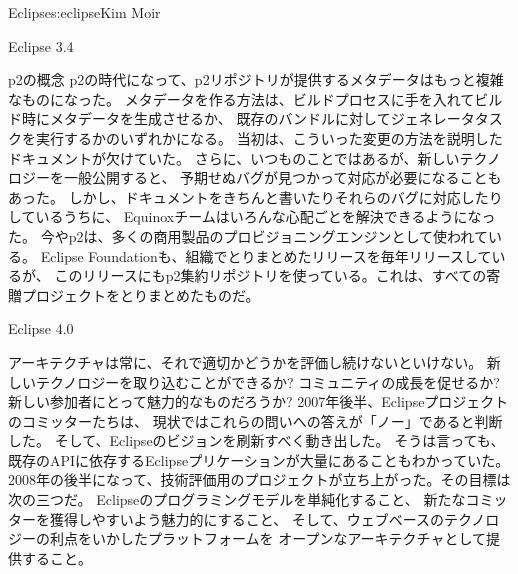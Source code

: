 \begin{aosachapter}{Eclipse}{s:eclipse}{Kim Moir}
\begin{aosasect1}{Eclipse 3.4}
\begin{aosasect2}{p2の概念}
p2の時代になって、p2リポジトリが提供するメタデータはもっと複雑なものになった。
メタデータを作る方法は、ビルドプロセスに手を入れてビルド時にメタデータを生成させるか、
既存のバンドルに対してジェネレータタスクを実行するかのいずれかになる。
当初は、こういった変更の方法を説明したドキュメントが欠けていた。
さらに、いつものことではあるが、新しいテクノロジーを一般公開すると、
予期せぬバグが見つかって対応が必要になることもあった。
しかし、ドキュメントをきちんと書いたりそれらのバグに対応したりしているうちに、
Equinoxチームはいろんな心配ごとを解決できるようになった。
今やp2は、多くの商用製品のプロビジョニングエンジンとして使われている。
Eclipse Foundationも、組織でとりまとめたリリースを毎年リリースしているが、
このリリースにもp2集約リポジトリを使っている。これは、すべての寄贈プロジェクトをとりまとめたものだ。

\end{aosasect2}

\end{aosasect1}

\begin{aosasect1}{Eclipse 4.0}

アーキテクチャは常に、それで適切かどうかを評価し続けないといけない。
新しいテクノロジーを取り込むことができるか?
コミュニティの成長を促せるか?
新しい参加者にとって魅力的なものだろうか?
2007年後半、Eclipseプロジェクトのコミッターたちは、
現状ではこれらの問いへの答えが「ノー」であると判断した。
そして、Eclipseのビジョンを刷新すべく動き出した。
そうは言っても、既存のAPIに依存するEclipseプリケーションが大量にあることもわかっていた。
2008年の後半になって、技術評価用のプロジェクトが立ち上がった。その目標は次の三つだ。
Eclipseのプログラミングモデルを単純化すること、
新たなコミッターを獲得しやすいよう魅力的にすること、
そして、ウェブベースのテクノロジーの利点をいかしたプラットフォームを
オープンなアーキテクチャとして提供すること。


\end{aosasect1}
\end{aosachapter}
